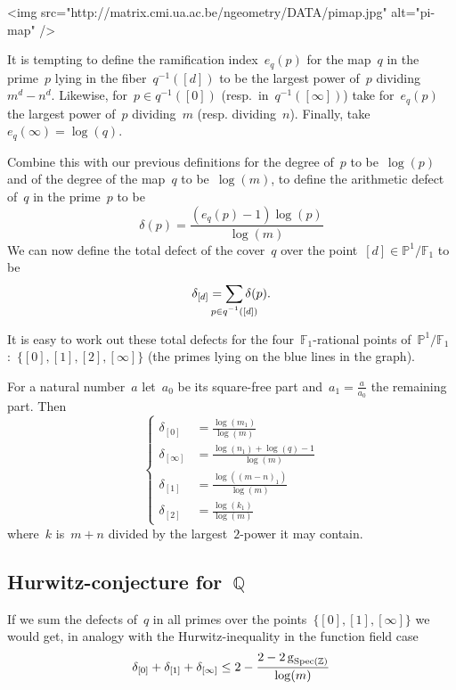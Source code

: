 <img src="http://matrix.cmi.ua.ac.be/ngeometry/DATA/pimap.jpg" alt="pi-map" />

It is tempting to define the ramification index~$e_q(p)$ for the map~$q$ in the prime~$p$ lying in the fiber~$q^{-1}([d])$ to be the largest power of~$p$ dividing~$m^d-n^d$. Likewise, for~$p \in q^{-1}([0])$ (resp.\ in~$q^{-1}([\infty])$) take for~$e_q(p)$ the largest power of~$p$ dividing~$m$ (resp. dividing~$n$). Finally, take~$e_q(\infty) = \log(q)$.

Combine this with our previous definitions for the degree of~$p$ to be~$\log(p)$ and of the degree of the map~$q$ to be~$\log(m)$, to define the arithmetic defect of~$q$ in the prime~$p$ to be
\begin{equation}
  \delta(p) = \frac{(e_q(p)-1) \log(p)}{\log(m)}
\end{equation}
We can now define the total defect of the cover~$q$ over the point~$[d] \in \mathbb{P}^1 / \mathbb{F}_1$ to be
\begin{equation}
  \delta_{[d]} = \sum_{\mathclap{p \in q^{-1}([d])}} \delta(p).
\end{equation}

It is easy to work out these total defects for the four~$\mathbb{F}_1$-rational points of~$\mathbb{P}^1 / \mathbb{F}_1$:\ $\{ [0],[1],[2],[\infty] \}$ (the primes lying on the blue lines in the graph). 

For a natural number~$a$ let~$a_0$ be its square-free part and~$a_1 = \tfrac{a}{a_0}$ the remaining part. Then
\begin{equation}
  \left\{
  \begin{aligned}
	  \delta_{[0]} &= \frac{\log(m_1)}{\log(m)} \\
	  \delta_{[\infty]} &= \frac{\log(n_1)+\log(q)-1}{\log(m)} \\
	  \delta_{[1]} &= \frac{\log((m-n)_1)}{\log(m)} \\
	  \delta_{[2]} &= \frac{\log(k_1)}{\log(m)}
  \end{aligned}
  \right.
\end{equation}
where~$k$ is~$m+n$ divided by the largest~$2$-power it may contain. 

\subsection{Hurwitz-conjecture for~$\mathbb{Q}$}

If we sum the defects of~$q$ in all primes over the points~$\{ [0],[1],[\infty] \}$ we would get, in analogy with the Hurwitz-inequality in the function field case
\begin{equation}
  \delta_{[0]}+\delta_{[1]}+\delta_{[\infty]} \leq 2 - \frac{2 - 2\operatorname{g}_{\operatorname{Spec}(\mathbb{Z})}}{\log(m)}
\end{equation}

